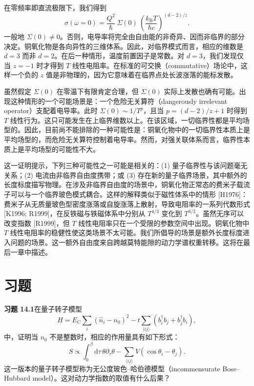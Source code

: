 在零频率即直流极限下，我们得到
\begin{equation*}
\sigma(\omega=0)=\frac{Q^{2}}{\hbar}\ \Sigma(0)\ \left(\frac{k_{\mathrm{B}}T}{\hbar c}\right)^{(d-2)/z}.\tag{14.61}
\end{equation*}
一般地 $\Sigma(0)\neq0$。否则，电导率将完全由自由能的非奇异、因而非临界的部分决定。铜氧化物是各向异性的三维体系。因此，对临界模式而言，相应的维数是 $d=3$ 而非 $d=2$。在后一种情形，温度前置因子是常数。对 $d=3$，我们发现仅当 $z=-1$ 时才得到 $T$ 线性电阻率。在标准的可交换（commutative）场论中，这样一个负的 $z$ 值是非物理的，因为它意味着在临界点处长波涨落的能标发散。

虽然假定 $\Sigma(0)$ 在零温下有限肯定合理，但 $\Sigma(0)$ 实际上发散也确有可能。出现这种情形的一个可能场景是：一个危险无关算符（dangerously irrelevant operator）支配着电导率。此时 $\Sigma(0)\sim1/T^{p}$，且当 $p=(d-2)/z+1$ 时得到 $T$ 线性行为。这只可能发生在上临界维数以上。在该区域，一切临界性都是平均场型的。因此，目前尚不能排除的一种可能性是：铜氧化物中的一切临界性本质上是平均场型的，而危险无关算符控制着电导率。然而，对强关联体系而言，临界性本质上是平均场型的可能性不大。

这一证明提示，下列三种可能性之一可能是相关的：(1) 量子临界性与该问题毫无关系；(2) 电流由非临界自由度携带；或 (3) 存在新的量子临界场景，其中额外的长度标度描写物理。在涉及非临界自由度的场景中，铜氧化物正常态的费米子载流子可以与一个临界玻色模式耦合。这样的解释类似于磁性体系中的情形 [H1976]：费米子从无质量玻色型密度涨落或自旋涨落上散射，导致电阻率的一系列代数形式 [K1996; R1999]，在反铁磁与铁磁体系中分别从 $T^{4/3}$ 变化到 $T^{3/2}$。虽然无序可以改变指数 [R1999]，但 $T$ 线性电阻率只在一个受限的参数空间中出现。铜氧化物中 $T$ 线性电阻率的稳健性使这类场景不太可能。我们所倡导的场景是额外长度标度进入问题的场景。这一额外自由度来自跨越莫特能隙的动力学谱权重转移。这将在最后一章中描述。

\section*{习题}

\textbf{习题 14.1}\quad 在量子转子模型
\begin{equation*}
H=E_{\mathrm{C}}\sum_{i}\left(\hat{n}_{i}-n_{0}\right)^{2}-t\sum_{\langle ij\rangle}\left(b_{i}^{\dagger}b_{j}+b_{j}^{\dagger}b_{i}\right),\tag{14.62}
\end{equation*}
中，证明当 $n_{0}$ 不是整数时，相应的作用量具有如下形式：
\begin{equation*}
S\propto\int_{0}^{\beta}\mathrm{d}\tau\,\theta\partial_{\tau}\theta-\sum_{\langle ij\rangle}V(\cos\theta_{i}-\theta_{j}).\tag{14.63}
\end{equation*}
这一版本的量子转子模型称为无公度玻色–哈伯德模型（incommensurate Bose--Hubbard model）。这对动力学指数的取值有什么后果？

